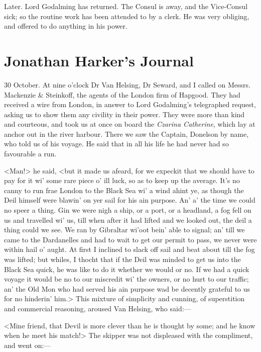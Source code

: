  

\begin{diary}{Later.}
Lord Godalming has returned. The Consul is away, and the Vice-Consul sick; so the routine work has been attended to by a clerk. He was very obliging, and offered to do anything in his power.
\end{diary}

\section{Jonathan Harker's Journal}

\begin{diary}{30 October.}
At nine o'clock Dr Van Helsing, Dr Seward, and I called on Messrs. Mackenzie \& Steinkoff, the agents of the London firm of Hapgood. They had received a wire from London, in answer to Lord Godalming's telegraphed request, asking us to show them any civility in their power. They were more than kind and courteous, and took us at once on board the \textit{Czarina Catherine}, which lay at anchor out in the river harbour. There we saw the Captain, Donelson by name, who told us of his voyage. He said that in all his life he had never had so favourable a run.

<Man!> he said, <but it made us afeard, for we expeckit that we should have to pay for it wi' some rare piece o' ill luck, so as to keep up the average. It's no canny to run frae London to the Black Sea wi' a wind ahint ye, as though the Deil himself were blawin' on yer sail for his ain purpose. An' a' the time we could no speer a thing. Gin we were nigh a ship, or a port, or a headland, a fog fell on us and travelled wi' us, till when after it had lifted and we looked out, the deil a thing could we see. We ran by Gibraltar wi'oot bein' able to signal; an' till we came to the Dardanelles and had to wait to get our permit to pass, we never were within hail o' aught. At first I inclined to slack off sail and beat about till the fog was lifted; but whiles, I thocht that if the Deil was minded to get us into the Black Sea quick, he was like to do it whether we would or no. If we had a quick voyage it would be no to our miscredit wi' the owners, or no hurt to our traffic; an' the Old Mon who had served his ain purpose wad be decently grateful to us for no hinderin' him.> This mixture of simplicity and cunning, of superstition and commercial reasoning, aroused Van Helsing, who said:—

<Mine friend, that Devil is more clever than he is thought by some; and he know when he meet his match!> The skipper was not displeased with the compliment, and went on:—


\end{diary}
